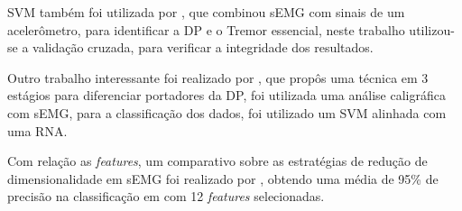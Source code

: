 SVM também foi utilizada por , que combinou sEMG com sinais de um acelerômetro, para identificar a DP e o Tremor essencial, neste trabalho utilizou-se a validação cruzada, para verificar a integridade dos resultados.

Outro trabalho interessante foi realizado por , que propôs uma técnica em 3 estágios para diferenciar portadores da DP, foi utilizada uma análise caligráfica com sEMG, para a classificação dos dados, foi utilizado um SVM alinhada com uma RNA.

Com relação as \textit{features}, um comparativo sobre as estratégias de redução de dimensionalidade em sEMG foi realizado por , obtendo uma média de 95\% de precisão na classificação em com 12 \textit{features} selecionadas. 